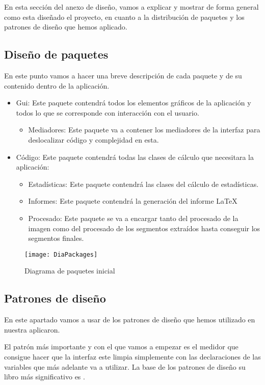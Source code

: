 En esta sección del anexo de diseño, vamos a explicar y mostrar de forma general como esta diseñado el proyecto, en cuanto a la distribución de paquetes y los patrones de diseño que hemos aplicado.

\subsection{Diseño de paquetes}

En este punto vamos a hacer una breve descripción de cada paquete y de su contenido dentro de la aplicación.

\begin{itemize}
\item Gui:
Este paquete contendrá todos los elementos gráficos de la aplicación y todos lo que se corresponde con interacción con el usuario.
	\begin{itemize}
	\item Mediadores:
	Este paquete va a contener los mediadores de la interfaz para deslocalizar código y complejidad en esta.
	\end{itemize}
\item Código: Este paquete contendrá todas las clases de cálculo que necesitara la aplicación:
	\begin{itemize}
	\item Estadísticas:
	Este paquete contendrá las clases del cálculo de estadísticas.
	\item Informes:
	Este paquete contendrá la generación del informe \LaTeX
	\item Procesado:
	Este paquete se va a encargar tanto del procesado de la imagen 			como del procesado de los segmentos extraídos hasta conseguir los 		segmentos finales.
	\end{itemize}
\end{itemize}

\begin{figure}[h]
	\centering
	\texttt{[image: DiaPackages]}
	\caption{Diagrama de paquetes inicial}
	\label{fig:C.1.2}
\end{figure}


\subsection{Patrones de diseño}
En este apartado vamos a usar de los patrones de diseño que hemos utilizado en nuestra aplicaron.

El patrón más importante y con el que vamos a empezar es el medidor que consigue hacer que la interfaz este limpia simplemente con las declaraciones de las variables que más adelante va a utilizar.
La base de los patrones de diseño su libro más significativo es \cite{Hunt2013}.

